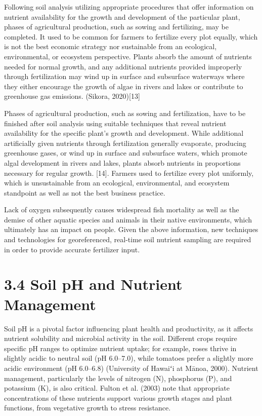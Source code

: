 \documentclass{book} %
\begin{document}
\noindent Following soil analysis utilizing appropriate procedures that offer information on nutrient availability for the growth and development of the particular plant, phases of agricultural production, such as sowing and fertilizing, may be completed. It used to be common for farmers to fertilize every plot equally, which is not the best economic strategy nor sustainable from an ecological, environmental, or ecosystem perspective. Plants absorb the amount of nutrients needed for normal growth, and any additional nutrients provided improperly through fertilization may wind up in surface and subsurface waterways where they either encourage the growth of algae in rivers and lakes or contribute to greenhouse gas emissions. (Sikora, 2020)[13] 

\noindent Phases of agricultural production, such as sowing and fertilization, have to be finished after soil analysis using suitable techniques that reveal nutrient availability for the specific plant's growth and development. While additional artificially given nutrients through fertilization generally evaporate, producing greenhouse gases, or wind up in surface and subsurface waters, which promote algal development in rivers and lakes, plants absorb nutrients in proportions necessary for regular growth. [14].  Farmers used to fertilize every plot uniformly, which is unsustainable from an ecological, environmental, and ecosystem standpoint as well as not the best business practice. 

\noindent 

\noindent Lack of oxygen subsequently causes widespread fish mortality as well as the demise of other aquatic species and animals in their native environments, which ultimately has an impact on people. Given the above information, new techniques and technologies for georeferenced, real-time soil nutrient sampling are required in order to provide accurate fertilizer input.

\noindent 
\section{3.4 Soil pH and Nutrient Management}

\noindent Soil pH is a pivotal factor influencing plant health and productivity, as it affects nutrient solubility and microbial activity in the soil. Different crops require specific pH ranges to optimize nutrient uptake; for example, roses thrive in slightly acidic to neutral soil (pH 6.0--7.0), while tomatoes prefer a slightly more acidic environment (pH 6.0--6.8) (University of Hawaiʻi at M\={a}noa, 2000). Nutrient management, particularly the levels of nitrogen (N), phosphorus (P), and potassium (K), is also critical. Fulton et al. (2003) note that appropriate concentrations of these nutrients support various growth stages and plant functions, from vegetative growth to stress resistance.
\end{document}
